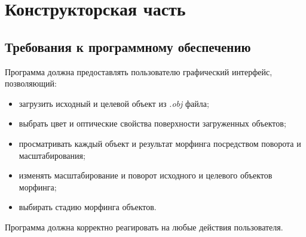 \chapter{Конструкторская часть}

\section{Требования к программному обеспечению}
Программа должна предоставлять пользователю графический интерфейс, позволяющий:
\begin{itemize}
	\item загрузить исходный и целевой объект из \textit{.obj} файла;
	\item выбрать цвет и оптические свойства поверхности загруженных объектов;
	\item просматривать каждый объект и результат морфинга посредством поворота и масштабирования;
	\item изменять масштабирование и поворот исходного и целевого объектов морфинга;
	\item выбирать стадию морфинга объектов.
\end{itemize}

Программа должна корректно реагировать на любые действия пользователя.

